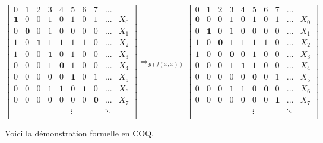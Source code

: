 \[
\begin{bmatrix}
 0 & 1 & 2 & 3 & 4 & 5 & 6 & 7 &  ... &     \\ 
 \mathbf{1} & 0 & 0 & 1 & 0 & 1 & 0 & 1 &  ... &   X_0 \\
 0 & \mathbf{0} & 0 & 1 & 0 & 0 & 0 & 0 &  ... &   X_1 \\
 1 & 0 & \mathbf{1} & 1 & 1 & 1 & 1 & 0 &  ... &   X_2 \\
 1 & 0 & 0 & \mathbf{1} & 0 & 1 & 0 & 0 &  ... &   X_3 \\
 0 & 0 & 0 & 1 & \mathbf{0} & 1 & 0 & 0 &  ... &   X_4 \\
 0 & 0 & 0 & 0 & 0 & \mathbf{1} & 0 & 1 &  ... &   X_5 \\
 0 & 0 & 0 & 1 & 1 & 0 & \mathbf{1} & 0 &  ... &   X_6 \\
 0 & 0 & 0 & 0 & 0 & 0 & 0 & \mathbf{0} &  ... &   X_7 \\
   &   &   &   &   & \vdots &  &  &\ddots  \\
\end{bmatrix}
\Rightarrow_{g(f(x,x))}
\begin{bmatrix}
 0 & 1 & 2 & 3 & 4 & 5 & 6 & 7 &  ... &     \\ 
 \mathbf{0} & 0 & 0 & 1 & 0 & 1 & 0 & 1 &  ... &   X_0 \\
 0 & \mathbf{1} & 0 & 1 & 0 & 0 & 0 & 0 &  ... &   X_1 \\
 1 & 0 & \mathbf{0} & 1 & 1 & 1 & 1 & 0 &  ... &   X_2 \\
 1 & 0 & 0 & \mathbf{0} & 0 & 1 & 0 & 0 &  ... &   X_3 \\
 0 & 0 & 0 & 1 & \mathbf{1} & 1 & 0 & 0 &  ... &   X_4 \\
 0 & 0 & 0 & 0 & 0 & \mathbf{0} & 0 & 1 &  ... &   X_5 \\
 0 & 0 & 0 & 1 & 1 & 0 & \mathbf{0} & 0 &  ... &   X_6 \\
 0 & 0 & 0 & 0 & 0 & 0 & 0 & \mathbf{1} &  ... &   X_7 \\
   &   &   &   &   & \vdots &  &  &\ddots  \\
\end{bmatrix}
\]


\vspace{0.5cm}

Voici la démonstration formelle en COQ.
\\


